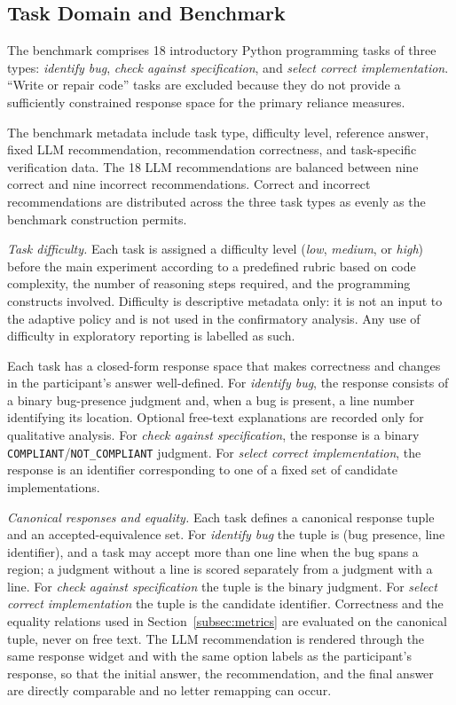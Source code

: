 \documentclass[oneside,final,14pt,a4paper]{extreport}
\begin{document}
\subsection{Task Domain and Benchmark}
\label{subsec:answerspace}

The benchmark comprises 18 introductory Python programming tasks 
of three types: \emph{identify bug}, \emph{check against specification}, 
and \emph{select correct implementation}. ``Write or repair code'' 
tasks are excluded because they do not provide a sufficiently constrained 
response space for the primary reliance measures.

The benchmark metadata include task type, difficulty level, reference answer,
fixed LLM recommendation, recommendation correctness, and task-specific
verification data. The 18 LLM recommendations are balanced between nine
correct and nine incorrect recommendations. Correct and incorrect
recommendations are distributed across the three task types as evenly as the
benchmark construction permits.

\emph{Task difficulty.} Each task is assigned a difficulty level
(\emph{low}, \emph{medium}, or \emph{high}) before the main experiment
according to a predefined rubric based on code complexity, the number of
reasoning steps required, and the programming constructs involved. Difficulty
is descriptive metadata only: it is not an input to the adaptive policy and is
not used in the confirmatory analysis. Any use of difficulty in exploratory
reporting is labelled as such.

Each task has a closed-form response space that makes correctness 
and changes in the participant's answer well-defined. For \emph{identify bug}, 
the response consists of a binary bug-presence judgment and, when a bug 
is present, a line number identifying its location. Optional free-text 
explanations are recorded only for qualitative analysis. 
For \emph{check against specification}, the response is a binary 
\texttt{COMPLIANT}/\texttt{NOT\_COMPLIANT} judgment. 
For \emph{select correct implementation}, the response is an identifier 
corresponding to one of a fixed set of candidate implementations.

\emph{Canonical responses and equality.} Each task defines a canonical response
tuple and an accepted-equivalence set. For \emph{identify bug} the tuple is
(bug presence, line identifier), and a task may accept more than one line when
the bug spans a region; a judgment without a line is scored separately from a
judgment with a line. For \emph{check against specification} the tuple is the
binary judgment. For \emph{select correct implementation} the tuple is the
candidate identifier. Correctness and the equality relations used in
Section~\ref{subsec:metrics} are evaluated on the canonical tuple, never on
free text. The LLM recommendation is rendered through the same response widget
and with the same option labels as the participant's response, so that the
initial answer, the recommendation, and the final answer are directly
comparable and no letter remapping can occur.
\end{document}
